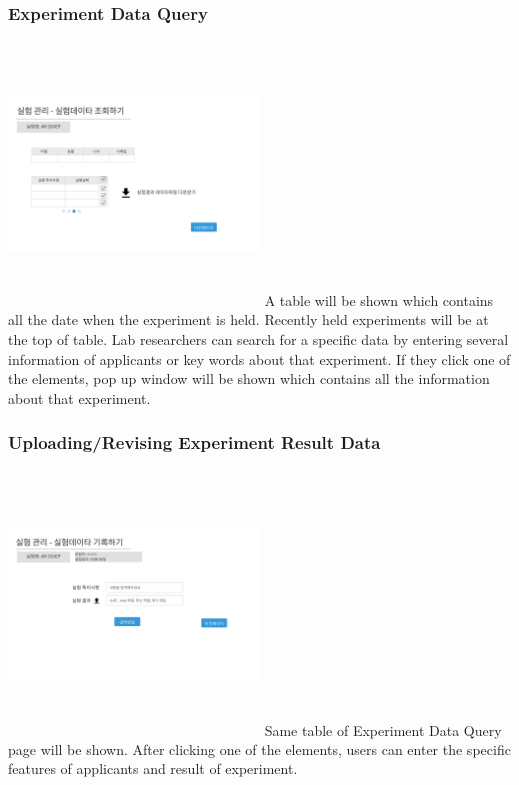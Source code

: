\documentclass[letterpaper, 10 pt, conference]{ieeeconf}  %
\begin{document}
\subsubsection{Experiment Data Query}
\includegraphics[width=0.5\textwidth,height = 7cm]{Oven_ver2/ver2]09_reviewingData.jpg}
A table will be shown which contains all the date when the experiment is held. Recently held experiments will be at the top of table. Lab researchers can search for a specific data by entering several information of applicants or key words about that experiment. If they click one of the elements, pop up window will be shown which contains all the information about that experiment. 


 

\subsubsection{Uploading/Revising Experiment Result Data}

\includegraphics[width=0.5\textwidth,height = 7cm]{Oven_ver2/ver2]08_recordingData.jpg}
Same table of Experiment Data Query page will be shown. After clicking one of the elements, users can enter the specific features of applicants and result of experiment. 
\end{document}
